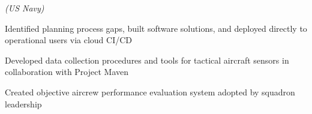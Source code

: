  \emph{(US Navy)}
\begin{subenum}
\item Identified planning process gaps, built software solutions, and deployed
  directly to operational users via cloud CI/CD
\item Developed data collection procedures and tools for tactical aircraft
  sensors in collaboration with Project Maven
\item Created objective aircrew performance evaluation system adopted by
  squadron leadership
\end{subenum}
